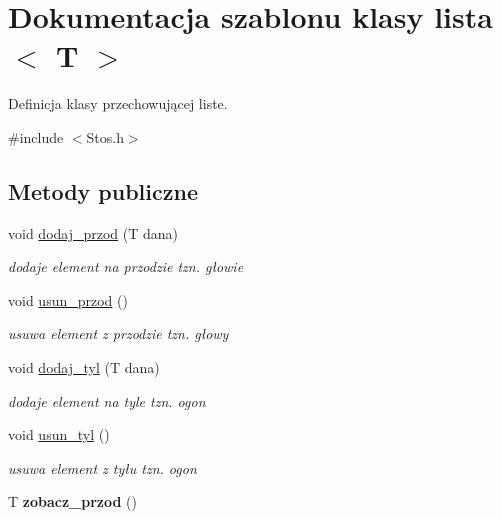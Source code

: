 \hypertarget{classlista}{\section{\-Dokumentacja szablonu klasy lista$<$ \-T $>$}
\label{classlista}
}


\-Definicja klasy przechowującej liste.  




{\ttfamily \#include $<$\-Stos.\-h$>$}

\subsection*{\-Metody publiczne}
\begin{DoxyCompactItemize}
\item 
\hypertarget{classlista_abfffecd8200714da1c80bb11b9aade5e}{void \hyperlink{classlista_abfffecd8200714da1c80bb11b9aade5e}{dodaj\-\_\-przod} (\-T dana)}\label{classlista_abfffecd8200714da1c80bb11b9aade5e}

\begin{DoxyCompactList}\small\item\em dodaje element na przodzie tzn. głowie \end{DoxyCompactList}\item 
\hypertarget{classlista_a6998ee006deb26a2e66d6b3df832a469}{void \hyperlink{classlista_a6998ee006deb26a2e66d6b3df832a469}{usun\-\_\-przod} ()}\label{classlista_a6998ee006deb26a2e66d6b3df832a469}

\begin{DoxyCompactList}\small\item\em usuwa element z przodzie tzn. głowy \end{DoxyCompactList}\item 
\hypertarget{classlista_ad35c120f3285b0a8a5069b540bc178ae}{void \hyperlink{classlista_ad35c120f3285b0a8a5069b540bc178ae}{dodaj\-\_\-tyl} (\-T dana)}\label{classlista_ad35c120f3285b0a8a5069b540bc178ae}

\begin{DoxyCompactList}\small\item\em dodaje element na tyle tzn. ogon \end{DoxyCompactList}\item 
\hypertarget{classlista_aa60cc53e042281898cead5bc99fd8fc8}{void \hyperlink{classlista_aa60cc53e042281898cead5bc99fd8fc8}{usun\-\_\-tyl} ()}\label{classlista_aa60cc53e042281898cead5bc99fd8fc8}

\begin{DoxyCompactList}\small\item\em usuwa element z tyłu tzn. ogon \end{DoxyCompactList}\item 
\hypertarget{classlista_aae75ab30e8130ff72c409ac74588e778}{\-T {\bfseries zobacz\-\_\-przod} ()}\label{classlista_aae75ab30e8130ff72c409ac74588e778}


\end{DoxyCompactItemize}
